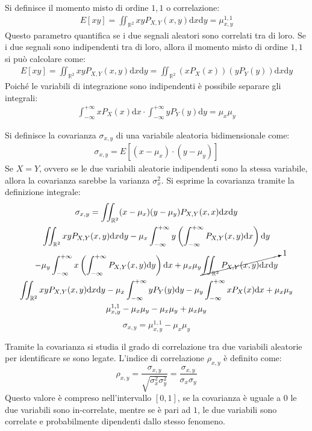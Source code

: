 \documentclass{article}
\newcommand{\df}{\mathrm{d}}
\numberwithin{equation}{subsection}
\begin{document}
Si definisce il momento misto di ordine $1,1$ o correlazione:
\begin{gather*}
    E[xy]=\displaystyle\iint_{\mathbb{R}^2}xyP_{X,Y}(x,y)\df x\df y=\mu_{x,y}^{1,1}
\end{gather*}
Questo parametro quantifica se i due segnali aleatori sono correlati tra di loro. Se i due segnali sono indipendenti tra di loro, allora il momento misto di ordine $1,1$ si 
può calcolare come:
\begin{gather*}
    E[xy]=\displaystyle\iint_{\mathbb{R}^2}xyP_{X,Y}(x,y)\df x\df y=\iint_{\mathbb{R}^2}(xP_X(x))(yP_Y(y))\df x\df y
\end{gather*}
Poiché le variabili di integrazione sono indipendenti è possibile separare gli integrali:
\begin{gather*}
    \displaystyle\int_{-\infty}^{+\infty}xP_X(x)\df x\cdot\int_{-\infty}^{+\infty}yP_Y(y)\df y=\mu_x\mu_y
\end{gather*}


Si definisce la covarianza $\sigma_{x,y}$ di una variabile aleatoria bidimensionale come:
\begin{gather*}
    \sigma_{x,y}=E[(x-\mu_x)\cdot(y-\mu_y)]
\end{gather*}
Se $X=Y$, ovvero se le due variabili aleatorie indipendenti sono la stessa variabile, allora la covarianza sarebbe la varianza $\sigma_x^2$. 
Si esprime la covarianza tramite la definizione integrale:
\begin{gather*}
    \sigma_{x,y}=\iint_{\mathbb{R}^2}(x-\mu_x)(y-\mu_y)P_{X,Y}(x,x)\df x\df y\\
    \displaystyle\iint_{\mathbb{R}^2}xyP_{X,Y}(x,y)\df x\df y-\mu_x\int_{-\infty}^{+\infty}y\left(\int_{-\infty}^{+\infty}P_{X,Y}(x,y)\df x\right)\df y\\
    -\displaystyle\mu_y\int_{-\infty}^{+\infty}x\left(\int_{-\infty}^{+\infty}P_{X,Y}(x,y)\df y\right)\df x+\mu_x\mu_y\cancelto{1}{\iint_{\mathbb{R}^2}P_{X,Y}(x,y)\df x\df y}\\
    \displaystyle\iint_{\mathbb{R}^2}xyP_{X,Y}(x,y)\df x\df y-\mu_x\int_{-\infty}^{+\infty}yP_Y(y)\df y-\mu_y\int_{-\infty}^{+\infty}xP_X(x)\df x+\mu_x\mu_y\\
    \mu_{x,y}^{1,1}-\mu_x\mu_y-\mu_x\mu_y+\mu_x\mu_y
\end{gather*}
\begin{equation}
    \sigma_{x,y}=\mu_{x,y}^{1,1}-\mu_x\mu_y
\end{equation}

Tramite la covarianza si studia il grado di correlazione tra due variabili aleatorie per identificare se sono legate. 
L'indice di correlazione $\rho_{x,y}$ è definito come:
\begin{equation}
    \rho_{x,y}=\displaystyle\frac{\sigma_{x,y}}{\sqrt{\sigma_x^2\sigma_y^2}}=\frac{\sigma_{x,y}}{\sigma_x\sigma_y}
\end{equation}
Questo valore è compreso nell'intervallo $[0,1]$, se la covarianza è uguale a $0$ le due variabili sono in-correlate, mentre se è pari ad $1$, le due variabili sono 
correlate e probabilmente dipendenti dallo stesso fenomeno. 
\end{document}

